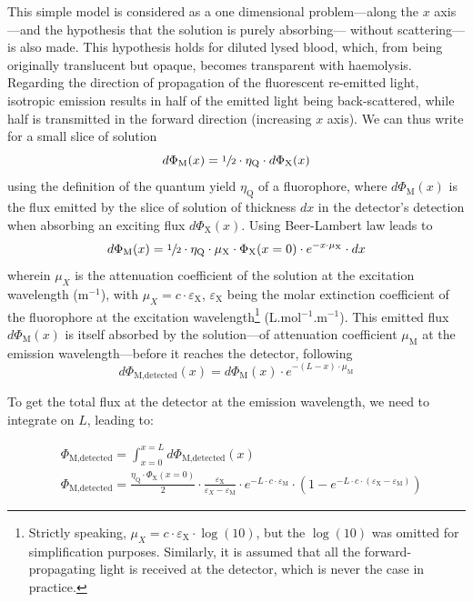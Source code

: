This simple model is considered as a one dimensional problem---along the $x$ axis---and the hypothesis that the solution is purely absorbing---\ie{} without scattering---is also made. This hypothesis holds for diluted lysed blood, which, from being originally translucent but opaque, becomes transparent with haemolysis. Regarding the direction of propagation of the fluorescent re-emitted light, isotropic emission results in half of the emitted light being back-scattered, while half is transmitted in the forward direction (increasing $x$ axis). We can thus write for a small slice of solution
\begin{equation}\label{anneq:fluo_quenching:quantum_yield}
	d\Phi_\text{M}(x)=\sfrac{1}{2} \cdot \eta_\text{Q} \cdot d\Phi_\text{X}(x)
\end{equation}
using the definition of the quantum yield $\eta_\text{Q}$ of a fluorophore\cite{bigio2016}, where $d\Phi_\text{M}(x)$ is the flux emitted by the slice of solution of thickness $dx$ in the detector's detection when absorbing an exciting flux $d\Phi_\text{X}(x)$. Using Beer-Lambert law leads to
\begin{equation}\label{anneq:fluo_quenching:beer_fluo}
	d\Phi_\text{M}(x) = \sfrac{1}{2} \cdot \eta_\text{Q} \cdot \mu_\text{X} \cdot \Phi_\text{X}(x=0) \cdot e^{-x \cdot \mu_\text{X}} \cdot dx
\end{equation}
wherein $\mu_X$ is the attenuation coefficient of the solution at the excitation wavelength (m$^{-1}$), with $\mu_X=c \cdot \varepsilon_\text{X}$, $\varepsilon_\text{X}$ being the molar extinction coefficient of the fluorophore at the excitation wavelength\footnote{Strictly speaking, $\mu_X=c \cdot \varepsilon_\text{X} \cdot \log(10)$, but the $\log(10)$ was omitted for simplification purposes. Similarly, it is assumed that all the forward-propagating light is received at the detector, which is never the case in practice.} (L.mol$^{-1}$.m$^{-1}$). This emitted flux $d\Phi_\text{M}(x)$ is itself absorbed by the solution---of attenuation coefficient $\mu_\text{M}$ at the emission wavelength---before it reaches the detector, following
\begin{equation}
	d\Phi_\text{M,detected}(x) = d\Phi_\text{M}(x) \cdot e^{-(L-x) \cdot \mu_\text{M}}
\end{equation}

To get the total flux at the detector at the emission wavelength, we need to integrate on $L$, leading to:

\begin{equation}
	\begin{split}
		&\Phi_\text{M,detected} = \int_{x=0}^{x=L} d\Phi_\text{M,detected}(x) \\
		&\Phi_\text{M,detected} = \frac{\eta_\text{Q} \cdot \Phi_\text{X}(x=0)}{2} \cdot \frac{\varepsilon_\text{X} }{\varepsilon_X - \varepsilon_\text{M}} \cdot e^{-L\cdot c \cdot \varepsilon_\text{M}} \cdot \left(1-e^{-L\cdot c \cdot (\varepsilon_\text{X} - \varepsilon_\text{M})}\right)
	\end{split}
\end{equation}

